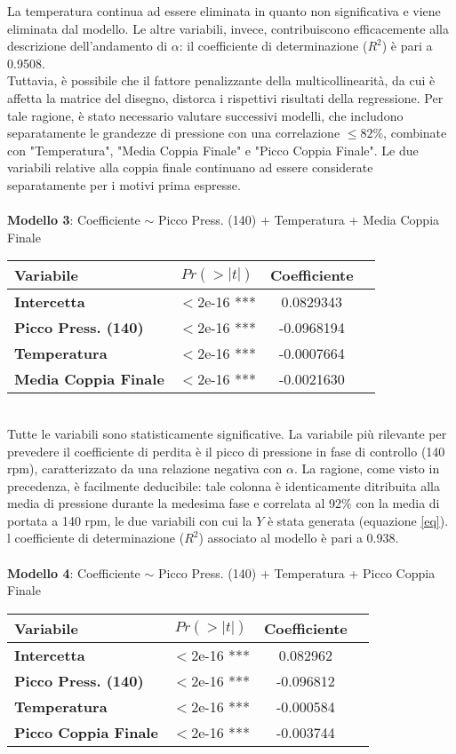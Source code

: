 \documentclass[fleqn,10pt]{SelfArx} %
\begin{document}
La temperatura continua ad essere eliminata in quanto non significativa e viene eliminata dal modello. Le altre variabili, invece, contribuiscono efficacemente alla descrizione dell'andamento di $\alpha$: il coefficiente di determinazione ($R^2$) è pari a 0.9508.\\
Tuttavia, è possibile che il fattore penalizzante della multicollinearità, da cui è affetta la matrice del disegno, distorca i rispettivi risultati della regressione. Per tale ragione, è stato necessario valutare successivi modelli, che includono separatamente le grandezze di pressione con una correlazione $\leq 82\%$, combinate con "Temperatura", "Media Coppia Finale" e "Picco Coppia Finale". Le due variabili relative alla coppia finale continuano ad essere considerate separatamente per i motivi prima espresse.\\
\\
\textbf{Modello 3}:  Coefficiente $\sim$  Picco Press. (140) + Temperatura + Media Coppia Finale
{\begin{table}[h] 
\centering
\begin{tabular}[t]{lccc}
\toprule 
Variabile&$Pr(> |t|)$&Coefficiente\\
\midrule 
\textbf{Intercetta}&$<$2e-16 ***&0.0829343\\ 
\textbf{Picco Press. (140)}&$<$2e-16 ***&-0.0968194\\
\textbf{Temperatura}&$<$2e-16 ***&-0.0007664\\
\textbf{Media Coppia Finale}&$<$2e-16 ***&-0.0021630\\
\bottomrule 
\end{tabular}
\end{table}}\\
Tutte le variabili sono statisticamente significative. La variabile più rilevante per prevedere il coefficiente di perdita è il picco di pressione in fase di controllo (140 rpm), caratterizzato da una relazione negativa con $\alpha$. La ragione, come visto in precedenza, è facilmente deducibile: tale colonna è identicamente ditribuita alla media di pressione durante la medesima fase e correlata al 92\% con la media di portata a 140 rpm, le due variabili con cui la $Y$ è stata generata (equazione \ref{eq}). l coefficiente di determinazione ($R^2$) associato al modello è pari a 0.938.\\
\\
\textbf{Modello 4}: Coefficiente $\sim$  Picco Press. (140) + Temperatura + Picco Coppia Finale
{\begin{table}[h] 
\centering
\begin{tabular}[t]{lccc}
\toprule 
Variabile&$Pr(> |t|)$&Coefficiente\\
\midrule 
\textbf{Intercetta}&$<$2e-16 ***&0.082962\\ 
\textbf{Picco Press. (140)}&$<$2e-16 ***&-0.096812\\
\textbf{Temperatura}&$<$2e-16 ***&-0.000584\\
\textbf{Picco Coppia Finale}&$<$2e-16 ***&-0.003744\\
\bottomrule 
\end{tabular}
\end{table}}\\
\end{document}
